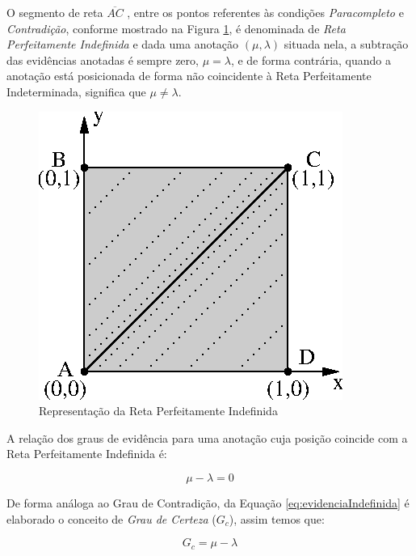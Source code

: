 O segmento de reta $\overline{ AC }$ , entre os pontos referentes às condições \emph{Paracompleto} e \emph{Contradição}, conforme mostrado na Figura \ref{fig:retaPerfeitamenteIndefinida}, é denominada de \emph{Reta Perfeitamente Indefinida} e dada uma anotação $(\mu, \lambda )$ situada nela, a subtração das evidências anotadas é sempre zero, $\mu = \lambda$, e de forma contrária, quando a anotação está posicionada de forma não coincidente à Reta Perfeitamente Indeterminada, significa que $\mu \neq \lambda$.

\begin{figure}[!htb]
\center\includegraphics[scale=1.25]{./pic/C426retaPerfeitamenteIndefinida.eps}
\caption{Representação da Reta Perfeitamente Indefinida}
\label{fig:retaPerfeitamenteIndefinida}
\end{figure}

A relação dos graus de evidência para uma anotação cuja posição coincide com a Reta Perfeitamente Indefinida é: 

\begin{center}
\begin{equation}
\mu - \lambda = 0
\label{eq:evidenciaIndefinida}
\end{equation}
\end{center}

De forma análoga ao Grau de Contradição, da Equação \ref{eq:evidenciaIndefinida} é elaborado o conceito de \emph{Grau de Certeza} ($G _c$), assim temos que: 

\begin{center}
\begin{equation}
G _{c} = \mu - \lambda
\label{eq:grauCerteza}
\end{equation}
\end{center}

